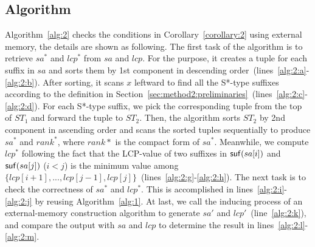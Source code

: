 \documentclass[10pt,journal,compsoc]{IEEEtran}
\begin{document}
\subsection{Algorithm} \label{sec:method2:algorithm}
Algorithm~\ref{alg:2} checks the conditions in Corollary~\ref{corollary:2} using external memory, the details are shown as following. The first task of the algorithm is to retrieve $sa^*$ and $lcp^*$ from $sa$ and $lcp$. For the purpose, it creates a tuple for each suffix in $sa$ and sorts them by 1st component in descending order~(lines~\ref{alg:2:a}-\ref{alg:2:b}). After sorting, it scans $x$ leftward to find all the S*-type suffixes according to the definition in Section~\ref{sec:method2:preliminaries}~(lines~\ref{alg:2:c}-\ref{alg:2:d}). For each S*-type suffix, we pick the corresponding tuple from the top of $ST_1$ and forward the tuple to $ST_2$. Then, the algorithm sorts $ST_2$ by 2nd component in ascending order and scans the sorted tuples sequentially to produce $sa^*$ and $rank^*$, where $rank*$ is the compact form of $sa^*$. Meanwhile, we compute $lcp^*$ following the fact that the LCP-value of two suffixes in ${\sf suf}(sa[i])$ and ${\sf suf}(sa[j])$ ($i < j$) is the minimum value among $\{lcp[i + 1], ..., lcp[j - 1], lcp[j]\}$~(lines~\ref{alg:2:g}-\ref{alg:2:h}). The next task is to check the correctness of $sa^*$ and $lcp^*$. This is accomplished in lines~\ref{alg:2:i}-\ref{alg:2:j} by reusing Algorithm~\ref{alg:1}. At last, we call the inducing process of an external-memory construction algorithm to generate $sa'$ and $lcp'$~(line~\ref{alg:2:k}), and compare the output with $sa$ and $lcp$ to determine the result in lines~\ref{alg:2:l}-\ref{alg:2:m}.
\end{document}
